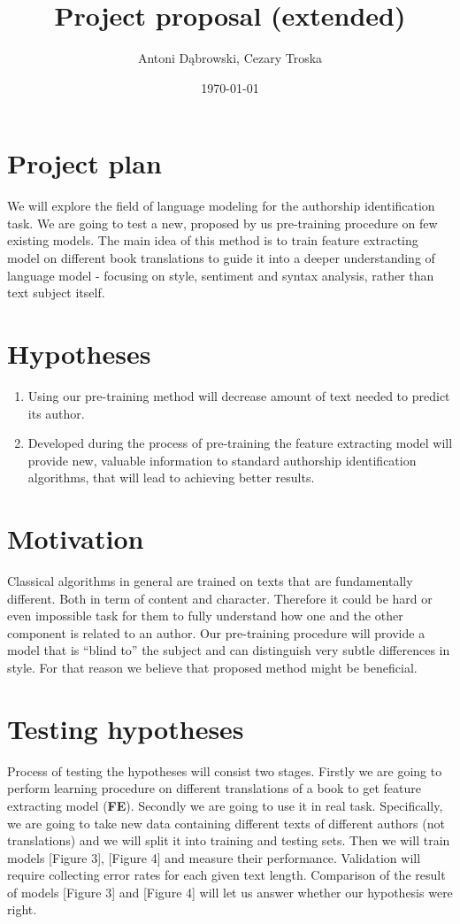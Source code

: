 \documentclass{article}
\title{Project proposal (extended)}
\author{Antoni Dąbrowski, Cezary Troska}
\date{\today}
\begin{document}
\maketitle
\section{Project plan}
We will explore the field of language modeling for the authorship identification task. We are going to test a new, proposed by us pre-training procedure on few existing models. The main idea of this method is to train feature extracting model on different book translations to guide it into a deeper understanding of language model - focusing on style, sentiment and syntax analysis, rather than text subject itself.

\section{Hypotheses}
\begin{enumerate}
    \item Using our pre-training method will decrease amount of text needed to predict its author.
    \item Developed during the process of pre-training the feature extracting model will provide new, valuable information to standard authorship identification algorithms, that will lead to achieving better results.
\end{enumerate}

\section{Motivation}
Classical algorithms in general are trained on texts that are fundamentally different. Both in term of content and character. Therefore it could be hard or even impossible task for them to fully understand how one and the other component is related to an author. Our pre-training procedure will provide a model that is ``blind to'' the subject and can distinguish very subtle differences in style. For that reason we believe that proposed method might be beneficial.

\section{Testing hypotheses}
Process of testing the hypotheses will consist two stages. Firstly we are going to perform learning procedure on different translations of a book to get feature extracting model (\textbf{FE}). Secondly we are going to use it in real task. Specifically, we are going to take new data containing different texts of different authors (not translations) and we will split it into training and testing sets. Then we will train models [Figure 3], [Figure 4] and measure their performance. Validation will require collecting error rates for each given text length. Comparison of the result of models [Figure 3] and [Figure 4] will let us answer whether our hypothesis were right.
\end{document}
